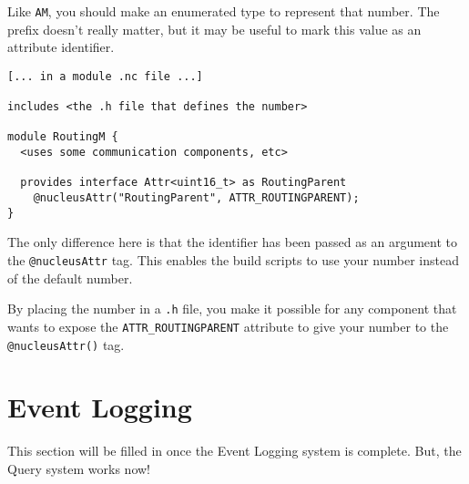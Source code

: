 \documentclass{article}
\begin{document}
Like {\tt AM}, you should make an enumerated type to represent that
number. The prefix doesn't really matter, but it may be useful to mark
this value as an attribute identifier.

\begin{verbatim}
[... in a module .nc file ...]

includes <the .h file that defines the number>

module RoutingM {
  <uses some communication components, etc>

  provides interface Attr<uint16_t> as RoutingParent 
    @nucleusAttr("RoutingParent", ATTR_ROUTINGPARENT);
}
\end{verbatim}

The only difference here is that the identifier has been passed as an
argument to the {\tt @nucleusAttr} tag. This enables the build scripts
to use your number instead of the default number.

By placing the number in a {\tt .h} file, you make it possible for any
component that wants to expose the {\tt ATTR\_ROUTINGPARENT} attribute
to give your number to the {\tt @nucleusAttr()} tag.

\newpage
\section{Event Logging}

This section will be filled in once the Event Logging system is
complete. But, the Query system works now!
\end{document}
